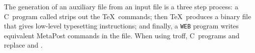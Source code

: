 The generation of an auxiliary file  from an input file
 is a three step process:  a C~program called 
strips out the \TeX\ commands; then \TeX\ produces a binary file that
gives low-level typesetting instructions; and finally, a {\tt WEB} program
 writes equivalent MetaPost commands in the 
file.  When using troff, C~programs  and  replace
 and .








